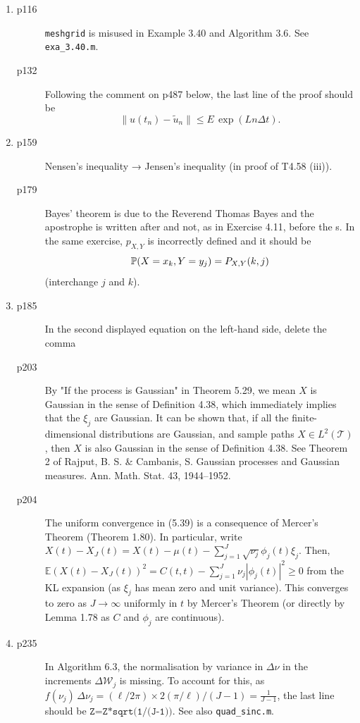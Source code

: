 \documentclass[final]{article}
\theoremstyle{definition}
\begin{document}
\begin{enumerate}
\begin{description}
   \end{description}
 \item%
   \begin{description}
   \item[p116] \texttt{meshgrid} is misused in Example 3.40 and Algorithm 3.6. See \texttt{exa\_3.40.m}.
   \item[p132] Following the comment on p487 below, the last line of the proof should be
\[
\|u(t_n) - \tilde u_n \|\le E\,\exp(L n \Delta t).
\]
\end{description}
 \item%
   \begin{description}
   \item[p159] Nensen’s inequality → Jensen’s inequality (in proof of T4.58 (iii)).
   \item[p179]  Bayes' theorem is due to the Reverend Thomas
     Bayes and the apostrophe is written after and not, as in
     Exercise 4.11, before the s. In the same exercise,
     $p_{X,Y}$ is incorrectly defined and it should be
     \[
     {\mathbb{P}}(X=x_k,Y=y_j)=P_{X,Y}(k,j)
     \]
(interchange $j$ and $k$).
   \end{description}
 \item%
   \begin{description}
   \item[p185] In the second displayed equation on the left-hand side, delete the comma

   \item[p203] By "If the process is Gaussian" in Theorem 5.29, we mean $X$ is Gaussian in the sense of Definition 4.38, which immediately implies that the $\xi_j$ are Gaussian. It can be shown that, if all the finite-dimensional distributions are Gaussian, and sample paths $X\in L^2(\mathcal T)$, then $X$ is also Gaussian in the sense of Definition 4.38. See Theorem 2 of Rajput, B. S. \& Cambanis, S. Gaussian processes and Gaussian measures. Ann. Math. Stat. 43, 1944–1952.



\item[p204]  The uniform convergence in (5.39) is a consequence of Mercer's Theorem (Theorem 1.80). In particular, write $X(t)-X_J(t)=X(t)-\mu(t)-\sum_{j=1}^J \sqrt{\nu_j} \phi_j(t) \xi_j$. Then, $\mathbb{E}(X(t)-X_J(t))^2=C(t,t)-\sum_{j=1}^J \nu_j |\phi_j(t)|^2\ge 0$ from the KL expansion (as $\xi_j$ has mean zero and unit variance). This converges to zero as $J\to\infty$  uniformly in $t$ by Mercer's Theorem (or directly by Lemma 1.78 as $C$ and $\phi_j$ are continuous).
   \end{description}
 \item%
   \begin{description}
\item[p235]
In Algorithm 6.3, the normalisation by variance in $\Delta \nu$ in the increments $\Delta \mathcal  W_j$ is missing. To account for this, as $f(\nu_j)\,\Delta \nu_j=(\ell/2\pi)\times 2(\pi/\ell)/ (J-1)  =\frac{1}{J-1}$, the last line should be $\texttt{Z=Z*sqrt(1/(J-1))}$. See also \verb+quad_sinc.m+.


\end{description}
\end{enumerate}
\end{document}
